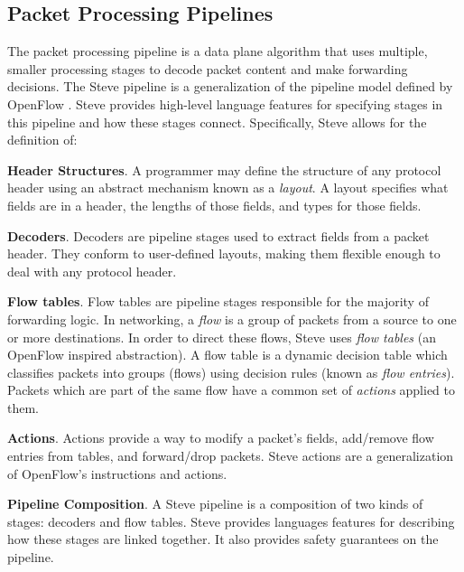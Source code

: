 \subsection{Packet Processing Pipelines}

The packet processing pipeline is a data plane algorithm that
uses multiple, smaller processing stages to decode packet content and make
forwarding decisions.
The Steve pipeline is a generalization
of the pipeline model defined by OpenFlow \cite{openflow_spec}.
Steve provides high-level language features for specifying
stages in this pipeline and how these stages connect.
Specifically, Steve allows for the definition of:

\textbf{Header Structures}.
A programmer may define the structure of any protocol header using an abstract
mechanism known as a \emph{layout}.
A layout specifies what fields are in a header, the lengths of those fields,
and types for those fields.

\textbf{Decoders}. Decoders are pipeline stages used to extract 
fields from a packet header. 
They conform to user-defined layouts, making them flexible enough
to deal with any protocol header.

%

\textbf{Flow tables}.
Flow tables are pipeline stages responsible for the majority of forwarding logic.
In networking, a \emph{flow} is a group of packets from a source to one 
or more  destinations. In order to direct these flows, Steve uses \emph{flow tables} (an OpenFlow inspired abstraction). 
A flow table is a dynamic
decision table which classifies packets into groups (flows) using
decision rules (known as \emph{flow entries}).
Packets which are part of the same flow have a common set of \emph{actions}
applied to them.

\textbf{Actions}. Actions provide a way to modify a packet's fields, add/remove
flow entries from tables, and forward/drop packets. Steve actions are a
generalization
of OpenFlow's instructions and actions.

\textbf{Pipeline Composition}. A Steve pipeline is a composition of two kinds of
stages: decoders and flow tables.
Steve provides languages features for describing how these stages are linked
together. It also provides safety guarantees on the pipeline.

